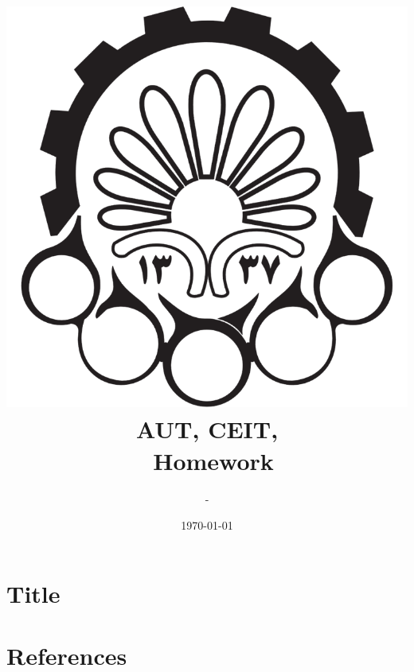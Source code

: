 \documentclass[a4paper]{article}
\title{
	\includegraphics{aut-logo.png}\\
	AUT, CEIT, \course \\
	\numofhw\ Homework
}
\author{\writer\ -\ \stdnum}
\date{\today}
\begin{document}
\maketitle
\thispagestyle{empty}
\pagebreak
{}

\section{Title}

\section{References}
\end{document}
